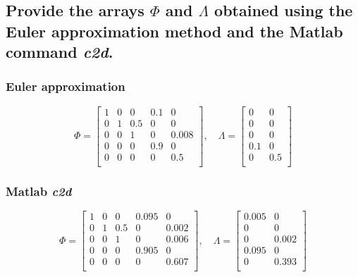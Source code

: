 \subsection{Provide the arrays $\Phi$ and $\Lambda$ obtained using the Euler approximation method and the Matlab command \textit{c2d}.}
\subsubsection*{Euler approximation}
\begin{equation}
    \Phi = 
    \left[ {\begin{array}{ccccc}
        1 &0 &0   &0.1 &0     \\
        0 &1 &0.5 &0   &0     \\
        0 &0 &1   &0   &0.008 \\
        0 &0 &0   &0.9 &0     \\
        0 &0 &0   &0   &0.5   \\
    \end{array} } \right]    
    ,\quad
    \Lambda =
    \left[ {\begin{array}{cc}
        0 &0\\
        0 &0\\
        0 &0\\
        0.1 &0\\
        0 &0.5\\
    \end{array} } \right]
\end{equation}

\subsubsection*{Matlab \textit{c2d}}
\begin{equation}
    \Phi = 
    \left[ {\begin{array}{ccccc}
        1 &0 &0   &0.095  &0     \\
        0 &1 &0.5 &0     &0.002     \\
        0 &0 &1   &0     &0.006 \\
        0 &0 &0   &0.905 &0     \\
        0 &0 &0   &0     &0.607   \\
    \end{array} } \right]    
    ,\quad
    \Lambda =
    \left[ {\begin{array}{cc}
        0.005 &0\\
        0 &0\\
        0 &0.002\\
        0.095 &0\\
        0 &0.393\\
    \end{array} } \right]
\end{equation}




